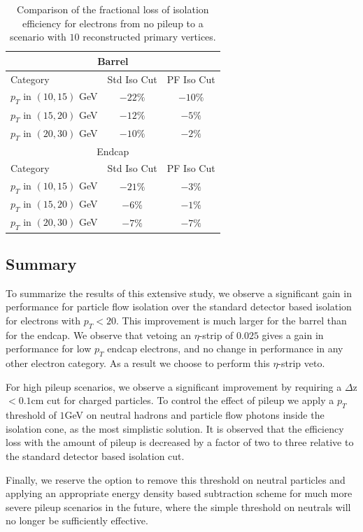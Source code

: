 \begin{table}[!htbp]
\begin{center}
\begin{tabular}{|l|c|c|}
\hline
\multicolumn{3}{|c|}{Barrel} \\
\hline
Category                  & Std Iso Cut & PF Iso Cut \\
\hline
$p_{T}$ in $(10,15)$ GeV  &  $-22\%$    & $-10\%$    \\
$p_{T}$ in $(15,20)$ GeV  &  $-12\%$    & $-5\%$     \\
$p_{T}$ in $(20,30)$ GeV  &  $-10\%$    & $-2\%$     \\
\hline
\multicolumn{3}{|c|}{Endcap} \\
\hline
Category                  & Std Iso Cut & PF Iso Cut \\
\hline
$p_{T}$ in $(10,15)$ GeV  &  $-21\%$    & $-3\%$    \\
$p_{T}$ in $(15,20)$ GeV  &  $-6\%$    & $-1\%$     \\
$p_{T}$ in $(20,30)$ GeV  &  $-7\%$    & $-7\%$     \\

\hline
\end{tabular}
\caption{Comparison of the fractional loss of isolation efficiency for electrons from no 
pileup to a scenario with $10$ reconstructed primary vertices. }
\label{tab:EleIsoEfficiency_LossFromPileup_CompareStdWithPF}
\end{center}
\end{table}




\subsection{Summary}

To summarize the results of this extensive study, we observe a significant gain in performance
for particle flow isolation over the standard detector based isolation for electrons with $p_{T}<20$. 
This improvement is much larger for the barrel than for the endcap. We observe that vetoing
an $\eta$-strip of $0.025$ gives a gain in performance for low $p_{T}$ endcap electrons, and no
change in performance in any other electron category. As a result we choose to perform this 
$\eta$-strip veto. 

For high pileup scenarios, we observe a significant improvement by requiring a $\Delta$z $ < 0.1$cm
cut for charged particles. To control the effect of pileup we apply a $p_{T}$ threshold of $1$GeV
on neutral hadrons and particle flow photons inside the isolation cone, as the most simplistic
solution. It is observed that the efficiency loss with the amount of pileup is decreased by a factor of
two to three relative to the standard detector based isolation cut. 

Finally, we reserve the option to remove this threshold on neutral particles and applying an appropriate 
energy density based subtraction scheme for much more severe pileup scenarios in the future, where 
the simple threshold on neutrals will no longer be sufficiently effective.


